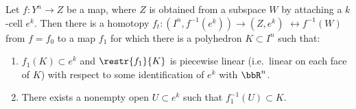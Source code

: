 \begin{lem}\label{lem 4.10 hatcher}
    Let $f:Y^n\to Z$ be a map, where $Z$ is obtained from a subspace $W$ by attaching a $k$-cell $e^k$. Then there is a homotopy $f_t:(I^n,f^{-1}(e^k))\to (Z,e^k)$ $\rel f^{-1}(W)$ from $f=f_0$ to a map $f_1$ for which there is a polyhedron $K\subset I^n$ such that:
    \begin{enumerate}[label=(\alph*)]
        \item $f_1(K)\subset e^k$ and $\restr{f_1}{K}$ is piecewise linear (i.e.~linear on each face of $K$) with respect to some identification of $e^k$ with $\bbR^n$.
        \item There exists a nonempty open $U\subset e^k$ such that $f_1^{-1}(U)\subset K$.
    \end{enumerate}
\end{lem}
